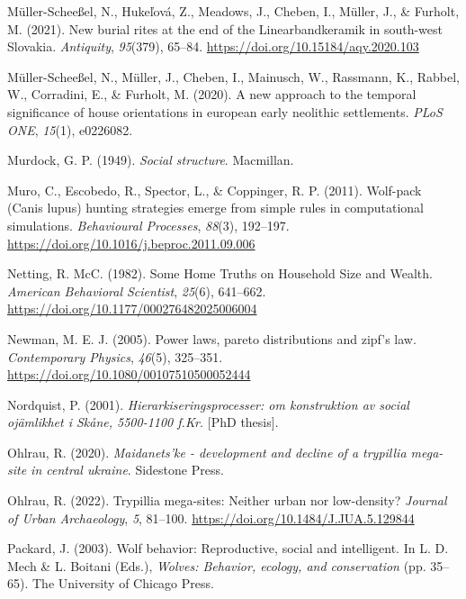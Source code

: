\documentclass[
  12pt,
]{book}
\newlength{\cslhangindent}
\newlength{\cslentryspacingunit} %
\newenvironment{CSLReferences}[2] %
 {%
  \setlength{\parindent}{0pt}
  \ifodd #1
  \let\oldpar\par
  \def\par{\hangindent=\cslhangindent\oldpar}
  \fi
  \setlength{\parskip}{#2\cslentryspacingunit}
 }%
 {}
\begin{document}
\begin{CSLReferences}{1}{0}
\leavevmode{}%
Müller-Scheeßel, N., Hukeľová, Z., Meadows, J., Cheben, I., Müller, J., \& Furholt, M. (2021). New burial rites at the end of the {Linearbandkeramik} in south-west {Slovakia}. \emph{Antiquity}, \emph{95}(379), 65--84. \url{https://doi.org/10.15184/aqy.2020.103}

\leavevmode{}%
Müller-Scheeßel, N., Müller, J., Cheben, I., Mainusch, W., Rassmann, K., Rabbel, W., Corradini, E., \& Furholt, M. (2020). A new approach to the temporal significance of house orientations in european early neolithic settlements. \emph{PLoS ONE}, \emph{15}(1), e0226082.

\leavevmode{}%
Murdock, G. P. (1949). \emph{Social structure}. Macmillan.

\leavevmode{}%
Muro, C., Escobedo, R., Spector, L., \& Coppinger, R. P. (2011). Wolf-pack (Canis lupus) hunting strategies emerge from simple rules in computational simulations. \emph{Behavioural Processes}, \emph{88}(3), 192--197. \url{https://doi.org/10.1016/j.beproc.2011.09.006}

\leavevmode{}%
Netting, R. McC. (1982). Some Home Truths on Household Size and Wealth. \emph{American Behavioral Scientist}, \emph{25}(6), 641--662. \url{https://doi.org/10.1177/000276482025006004}

\leavevmode{}%
Newman, M. E. J. (2005). Power laws, pareto distributions and zipf's law. \emph{Contemporary Physics}, \emph{46}(5), 325--351. \url{https://doi.org/10.1080/00107510500052444}

\leavevmode{}%
Nordquist, P. (2001). \emph{Hierarkiseringsprocesser: om konstruktion av social ojämlikhet i Skåne, 5500-1100 f.Kr.} {[}PhD thesis{]}.

\leavevmode{}%
Ohlrau, R. (2020). \emph{Maidanets'ke - development and decline of a trypillia mega-site in central ukraine}. Sidestone Press.

\leavevmode{}%
Ohlrau, R. (2022). Trypillia mega-sites: Neither urban nor low-density? \emph{Journal of Urban Archaeology}, \emph{5}, 81--100. \url{https://doi.org/10.1484/J.JUA.5.129844}

\leavevmode{}%
Packard, J. (2003). Wolf behavior: Reproductive, social and intelligent. In L. D. Mech \& L. Boitani (Eds.), \emph{Wolves: Behavior, ecology, and conservation} (pp. 35--65). {The University of Chicago Press}.


\end{CSLReferences}
\end{document}
